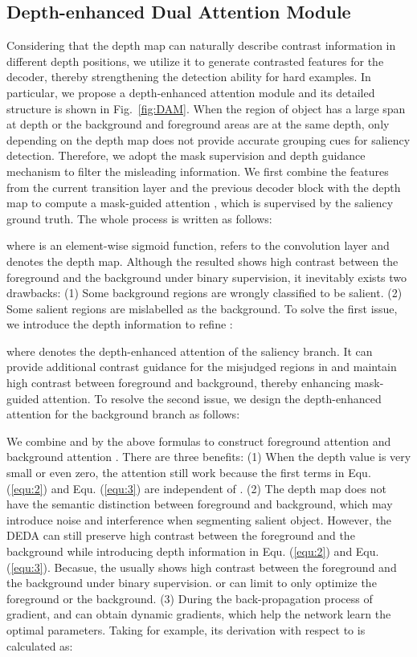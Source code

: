 \documentclass[runningheads]{llncs}
\begin{document}
\subsection{Depth-enhanced Dual Attention Module}\label{sec:DAM}
Considering that the depth map can naturally describe contrast information in different depth positions, we utilize it to generate contrasted features for the decoder, thereby strengthening the detection ability for hard examples. In particular, we propose a depth-enhanced attention module and its detailed structure is shown in Fig.~\ref{fig:DAM}.
When the region of object has a large span at depth or the background and foreground areas are at the same depth, only depending on the depth map does not provide accurate grouping cues for saliency detection. Therefore, we adopt the mask supervision and depth guidance mechanism to filter the misleading information. 
We first combine the features from the current transition layer and the previous decoder block with the depth map to compute a mask-guided attention , which is supervised by the saliency ground truth. The whole process is written as follows:

where  is an element-wise sigmoid function,  refers to the convolution layer and  denotes the depth map.  
Although the resulted  shows high contrast between the foreground and the background under binary supervision, it inevitably exists two drawbacks: (1) Some background regions are wrongly classified to be salient. (2) Some salient regions are mislabelled as the background.
To solve the first issue, we introduce the depth information to refine :

where  denotes the depth-enhanced attention of the saliency branch. 
It can provide additional contrast guidance for the misjudged regions in  and maintain high contrast between foreground and background, thereby enhancing mask-guided attention.
To resolve the second issue, we design the depth-enhanced attention  for the background branch as follows:


We combine  and  by the above formulas to construct foreground attention  and background attention . 
There are three benefits: (1) When the depth value is very small or even zero, the attention still work because the first terms in Equ. (\ref{equ:2}) and Equ. (\ref{equ:3}) are independent of . (2) The depth map does not have the semantic distinction between foreground and background, which may introduce noise and interference when segmenting salient object. However, the DEDA can still preserve high contrast between the foreground and the background while introducing depth information in Equ. (\ref{equ:2}) and Equ. (\ref{equ:3}). Becasue, the  usually shows high contrast between the foreground and the background under binary supervision.    or    can limit  to only optimize the foreground or the background.
(3) During the back-propagation process of gradient,  and  can obtain dynamic gradients, which help the network learn the optimal parameters. Taking   for example, its derivation with respect to  is calculated as:
\end{document}
